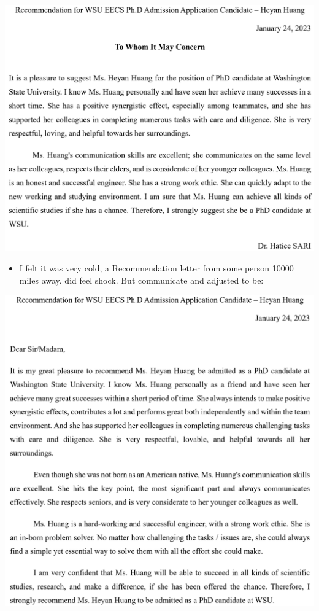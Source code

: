 \documentclass[9pt, b5paper]{article}
\begin{document}
\includegraphics[width=.9\linewidth]{./pic/readme2_20230329_092732.png}
\begin{itemize}
\item I felt it was very cold, a Recommendation letter from some person 10000 miles away. did feel shock. But communicate and adjusted to be:
\end{itemize}

\includegraphics[width=.9\linewidth]{./pic/readme2_20230329_094952.png}
\end{document}
